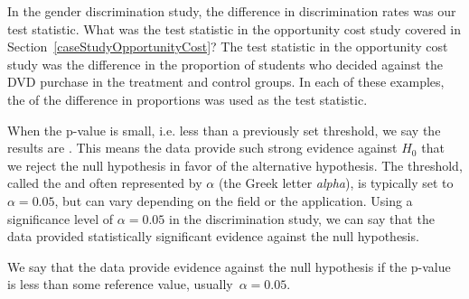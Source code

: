 \textA{\pagebreak}

\begin{example}{In the gender discrimination study, the difference in discrimination rates was our test statistic. What was the test statistic in the opportunity cost study covered in Section~\ref{caseStudyOpportunityCost}?}
The test statistic in the opportunity cost study was the difference in the proportion of students who decided against the DVD purchase in the treatment and control groups. In each of these examples, the  of the difference in proportions was used as the test statistic.
\end{example}

When the p-value is small, i.e. less than a previously set threshold, we say the results are . This means the data provide such strong evidence against $H_0$ that we reject the null hypothesis in favor of the alternative hypothesis. The threshold, called the  and often represented by $\alpha$ (the Greek letter \emph{alpha}\label{alphadiscussion}), is typically set to $\alpha = 0.05$, but can vary depending on the field or the application. Using a  significance level of $\alpha = 0.05$ in the discrimination study, we can say that the data provided statistically significant evidence against the null hypothesis.

\begin{termBox}{
We say that the data provide  evidence against the null hypothesis if the p-value is less than some reference value, usually~$\alpha=0.05$.}
\end{termBox}


